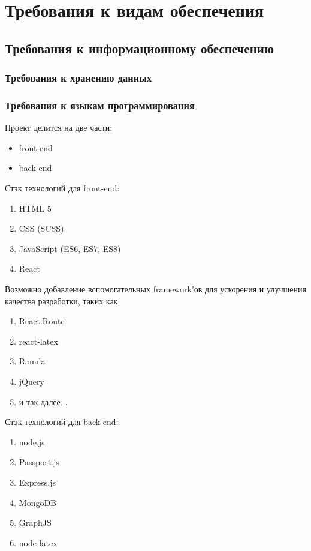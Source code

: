 \section{Требования к видам обеспечения}
\subsection{Требования к информационному обеспечению}
\subsubsection{Требования к хранению данных}
\subsubsection{Требования к языкам программирования}
Проект делится на две части:
\begin{itemize}
    \item front-end
    \item back-end
\end{itemize}
Стэк технологий для front-end:
\begin{enumerate}
    \item HTML 5
    \item CSS (SCSS)
    \item JavaScript (ES6, ES7, ES8)
    \item React
\end{enumerate}
Возможно добавление вспомогательных framework'ов для ускорения и улучшения качества разработки, таких как:
\begin{enumerate}
    \item React.Route
    \item react-latex
    \item Ramda
    \item jQuery
    \item и так далее...
\end{enumerate}
Стэк технологий для back-end:
\begin{enumerate}
    \item node.js
    \item Passport.js
    \item Express.js
    \item MongoDB
    \item GraphJS
    \item node-latex
\end{enumerate}
